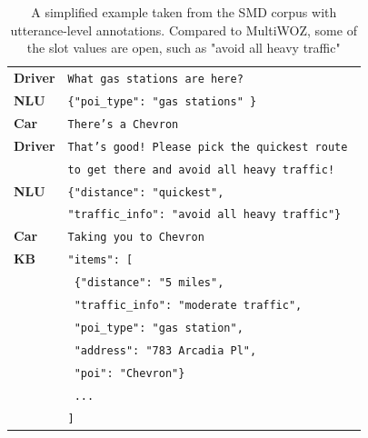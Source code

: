 \begin{table}[tp]
    \centering
    \begin{tabular}{l|l}
    \toprule
         \textbf{Driver} & \texttt{What {\color{cyan!80!yellow!80!black!100}gas stations} are here?} \\
         \textbf{NLU} & \texttt{\{"poi\_type": "{\color{cyan!80!yellow!80!black!100}gas stations}" \}} \\
         \textbf{Car} & \texttt{There's a Chevron} \\
         \textbf{Driver} & \texttt{That's good! Please pick the {\color{cyan!80!yellow!80!black!100}quickest} route }\\ & \texttt{to get there and {\color{orange!50!yellow!90!black!100!}avoid all heavy traffic}!} \\
         \textbf{NLU} & \texttt{\{"distance": "{\color{cyan!80!yellow!80!black!100}quickest}",} \\
            & \texttt{"traffic\_info": "{\color{orange!50!yellow!90!black!100!}avoid all heavy traffic}"\} }\\
         \textbf{Car} & \texttt{Taking you to Chevron} \\
         \midrule
         \textbf{KB} & \texttt{"items": [} \\
          & \texttt{    \{"distance": "5 miles",} \\
          & \texttt{    "traffic\_info": "moderate traffic",} \\
          & \texttt{    "poi\_type": "gas station",} \\
          & \texttt{    "address": "783 Arcadia Pl",} \\
          & \texttt{    "poi": "Chevron"\}} \\
          & \texttt{    ...} \\
          & \texttt{]} \\
          \bottomrule
    \end{tabular}
    \caption{A simplified example taken from the SMD corpus with utterance-level annotations. Compared to MultiWOZ, some of the slot values are open, such as "avoid all heavy traffic"}
    \label{02:tab:smd_example}
\end{table}
